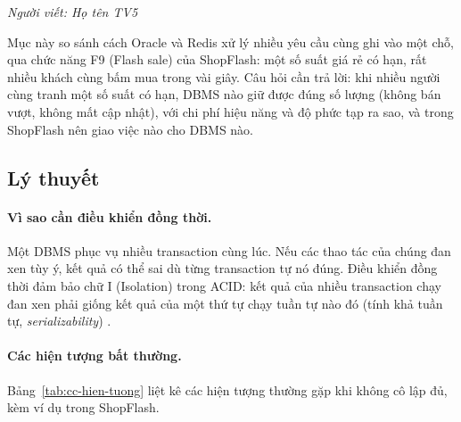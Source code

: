 

\noindent\textit{Người viết: Họ tên TV5}

Mục này so sánh cách Oracle và Redis xử lý nhiều yêu cầu cùng ghi vào một chỗ, qua chức năng F9 (Flash sale) của ShopFlash: một số suất giá rẻ có hạn, rất nhiều khách cùng bấm mua trong vài giây. Câu hỏi cần trả lời: khi nhiều người cùng tranh một số suất có hạn, DBMS nào giữ được đúng số lượng (không bán vượt, không mất cập nhật), với chi phí hiệu năng và độ phức tạp ra sao, và trong ShopFlash nên giao việc nào cho DBMS nào.

\subsection{Lý thuyết}\label{sec:cc-ly-thuyet}

\paragraph{Vì sao cần điều khiển đồng thời.} Một DBMS phục vụ nhiều transaction cùng lúc. Nếu các thao tác của chúng đan xen tùy ý, kết quả có thể sai dù từng transaction tự nó đúng. Điều khiển đồng thời đảm bảo chữ I (Isolation) trong ACID: kết quả của nhiều transaction chạy đan xen phải giống kết quả của một thứ tự chạy tuần tự nào đó (tính khả tuần tự, \emph{serializability}) \cite{cc-silberschatz2019}.

\paragraph{Các hiện tượng bất thường.} Bảng~\ref{tab:cc-hien-tuong} liệt kê các hiện tượng thường gặp khi không cô lập đủ, kèm ví dụ trong ShopFlash.

